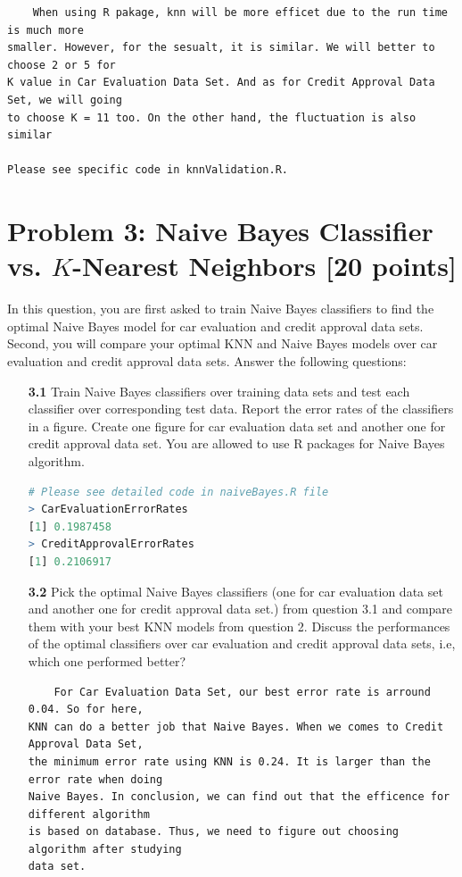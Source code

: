 \documentclass{article}
\begin{document}
\begin{verbatim}
    When using R pakage, knn will be more efficet due to the run time is much more 
smaller. However, for the sesualt, it is similar. We will better to choose 2 or 5 for 
K value in Car Evaluation Data Set. And as for Credit Approval Data Set, we will going 
to choose K = 11 too. On the other hand, the fluctuation is also similar

Please see specific code in knnValidation.R.
\end{verbatim}
\pagebreak
\section*{Problem 3: Naive Bayes Classifier vs. $K$-Nearest Neighbors [20 points]} 

In this question, you are  first asked to train Naive Bayes classifiers to find the optimal Naive Bayes model for  car evaluation and credit approval data sets. Second, you will  compare your optimal KNN and Naive Bayes models over  car evaluation and credit approval data sets.  Answer the following questions:

\begin{enumerate}
\item[\textbf{3.1}] Train Naive Bayes classifiers over training data sets and test each classifier over corresponding  test data.  Report the error rates  of the classifiers  in a figure. Create one figure for car evaluation  data set and  another one for credit approval data set. You are allowed to use R packages for Naive Bayes algorithm.
\begin{lstlisting}[language=R]
# Please see detailed code in naiveBayes.R file
> CarEvaluationErrorRates
[1] 0.1987458
> CreditApprovalErrorRates
[1] 0.2106917
\end{lstlisting}
\item[\textbf{3.2}] Pick the optimal Naive Bayes classifiers (one for  car evaluation  data set and  another one for credit approval data set.) from question 3.1 and compare them with your best KNN models from question 2. Discuss the performances of the optimal classifiers over car evaluation and credit approval data sets, i.e, which one performed better? 
\begin{verbatim}
    For Car Evaluation Data Set, our best error rate is arround 0.04. So for here, 
KNN can do a better job that Naive Bayes. When we comes to Credit Approval Data Set, 
the minimum error rate using KNN is 0.24. It is larger than the error rate when doing 
Naive Bayes. In conclusion, we can find out that the efficence for different algorithm 
is based on database. Thus, we need to figure out choosing algorithm after studying 
data set.
\end{verbatim}
\end{enumerate}
\pagebreak
\end{document}
